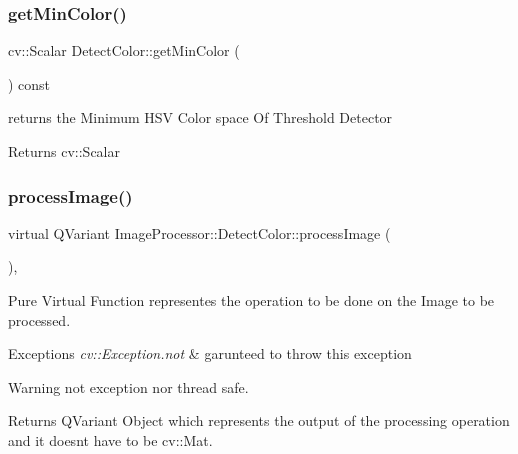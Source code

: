 \subsubsection{\texorpdfstring{get\+Min\+Color()}{getMinColor()}}
{\footnotesize\ttfamily cv\+::\+Scalar Detect\+Color\+::get\+Min\+Color (\begin{DoxyParamCaption}{ }\end{DoxyParamCaption}) const}



returns the Minimum H\+SV Color space Of Threshold Detector 

\begin{DoxyReturn}{Returns}
cv\+::\+Scalar 
\end{DoxyReturn}
\mbox{\label{class_image_processor_1_1_detect_color_a7dc9d23817afafa44a9c022dff64b4a5}} 
\subsubsection{\texorpdfstring{process\+Image()}{processImage()}\hspace{0.1cm}{\footnotesize\ttfamily [1/2]}}
{\footnotesize\ttfamily virtual Q\+Variant Image\+Processor\+::\+Detect\+Color\+::process\+Image (\begin{DoxyParamCaption}{ }\end{DoxyParamCaption})\hspace{0.3cm}{\ttfamily [override]}, {\ttfamily [virtual]}}



Pure Virtual Function representes the operation to be done on the Image to be processed. 


\begin{DoxyExceptions}{Exceptions}
{\em cv\+::\+Exception.\+not} & garunteed to throw this exception \\
\hline
\end{DoxyExceptions}
\begin{DoxyWarning}{Warning}
not exception nor thread safe. 
\end{DoxyWarning}
\begin{DoxyReturn}{Returns}
Q\+Variant Object which represents the output of the processing operation and it doesn\textquotesingle{}t have to be cv\+::\+Mat. 
\end{DoxyReturn}


